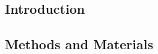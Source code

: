 




\frenchspacing
\raggedbottom
{} 
\pagestyle{plain}

%

\cleardoublepage
\cleardoublepage
\cleardoublepage
\cleardoublepage

\pagestyle{scrheadings}
\cleardoublepage

\cleardoublepage
\begin{addmargin}[-1cm]{-3cm}
\part{Introduction}
\end{addmargin}




\cleardoublepage
\begin{addmargin}[-1cm]{-3cm}
\part{Methods and Materials}
\end{addmargin}

